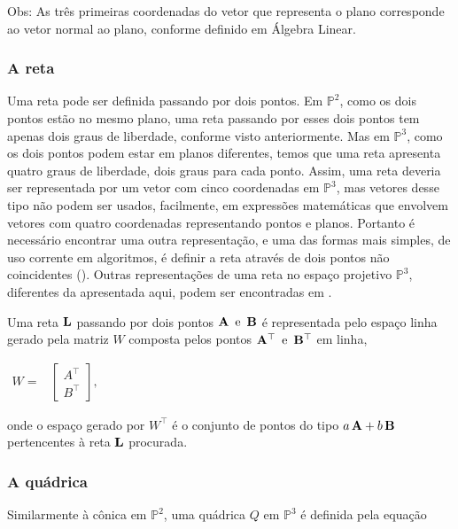 Obs: As três primeiras coordenadas do vetor que representa o plano corresponde ao vetor normal ao plano, conforme definido em Álgebra Linear.
\\


\subsubsection*{A reta}

Uma reta pode ser definida passando por dois pontos. Em $\mathbb{P}^2$, como os dois pontos estão no mesmo plano, uma reta passando por esses dois pontos tem apenas dois graus de liberdade, conforme visto anteriormente. Mas em $\mathbb{P}^3$, como os dois pontos podem estar em planos diferentes, temos que uma reta apresenta quatro graus de liberdade, dois graus para cada ponto. Assim, uma reta deveria ser representada por um vetor com cinco coordenadas em $\mathbb{P}^3$, mas vetores desse tipo não podem ser usados, facilmente, em expressões matemáticas que envolvem vetores com quatro coordenadas representando pontos e planos. Portanto é necessário encontrar uma outra representação, e uma das formas mais simples, de uso corrente em algoritmos, é definir a reta através de dois pontos não coincidentes (\citep{bib:kuang}). Outras representações de uma reta no espaço projetivo $\mathbb{P}^3$, diferentes da apresentada aqui, podem ser encontradas em \cite{Hartley2004}.


Uma reta ${\bf L}$ passando por dois pontos ${\bf A} \,\,\, \text{e} \,\,\, {\bf B}$ é representada pelo espaço linha gerado pela matriz $W$ composta pelos pontos ${\bf A}^\top \,\,\,\text{e} \,\,\, {\bf B}^\top$ em linha,

\begin{center}
$
\begin{array}{cc}
W = 
& \begin{bmatrix}
  A^\top\\
  B^\top
  \end{bmatrix},
\end{array}
$
\end{center}
onde o espaço gerado por $W^\top$ é o conjunto de pontos do tipo $a\,{\bf A} + b\,{\bf B}$ pertencentes à reta ${\bf L}$ procurada. \\


\subsubsection*{A quádrica}


Similarmente à cônica em $\mathbb{P}^2$, uma quádrica $Q$ em $\mathbb{P}^3$ é definida pela equação

